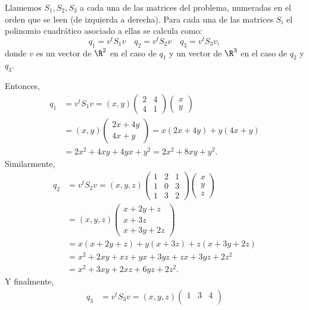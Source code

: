 	\begin{sol}
		Llamemos $S_1,S_2,S_3$ a cada una de las matrices del problema, numeradas en el orden que se leen (de izquierda a derecha). Para cada una de las matrices $S_i$ el polinomio cuadrático asociado a ellas se calcula como:
		\[ q_1 = v^tS_1v\quad q_2=v^tS_2v\quad q_3=v^tS_3v, \]
		donde $v$ es un vector de $\R^2$ en el caso de $q_1$ y un vector de $\R^3$ en el caso de $q_2$ y $q_3$.
		
		Entonces,
		\begin{align*}
		q_1 &=  v^tS_1v 
		= (x,y) \begin{pmatrix}
		2 & 4 \\ 4 & 1
		\end{pmatrix} \begin{pmatrix}
		x \\ y
		\end{pmatrix} \\
		&= (x,y) \begin{pmatrix}
		2x+4y \\
		4x+y
		\end{pmatrix} 
		= x(2x+4y) + y(4x+y)\\
		&= 2x^2+4xy+4yx+y^2 
		= 2x^2+8xy+y^2.
		\end{align*}
		Similarmente,
		\begin{align*}
		q_2 &= v^tS_2v 
		= (x,y,z) \begin{pmatrix}
		1 & 2 &1 \\
		1 & 0 & 3 \\
		1 & 3 & 2
		\end{pmatrix} \begin{pmatrix}
		x \\ y \\ z
		\end{pmatrix} \\
		&= (x,y,z)\begin{pmatrix}
		x+2y+z \\
		x+3z \\
		x+3y+2z
		\end{pmatrix} \\
		&=x(x+2y+z) + y(x+3z) + z(x+3y+2z) \\
		&=x^2+2xy+xz+yx+3yz+zx+3yz+2z^2 \\
		&=x^2+3xy+2xz+6yz+2z^2.
		\end{align*}
		Y finalmente,
		\begin{align*}
		q_3 &= v^tS_3v 
		= (x,y,z)\begin{pmatrix}
		1 & 3 &4 \\

\end{pmatrix}
\end{align*}
\end{sol}
